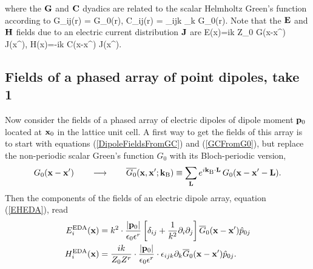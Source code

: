 \documentclass[letterpaper]{article}
\begin{document}
where the $\mathbf{G}$ and $\mathbf{C}$ dyadics are related to the
scalar Helmholtz Green's function according to
{
  G_{ij}(\vb r)
   =  G_0(\vb r),
\qquad
   C_{ij}(\vb r)
   = \varepsilon_{ijk} \partial_k G_0(\vb r).
}
Note that the $\mathbf{E}$ and $\mathbf{H}$ fields due to an electric 
current distribution $\mathbf{J}$ are
{ \vb E(\vb x)=ik Z_0 \int \vb G(\vb x-\vb x^\prime) \cdot \vb J(\vb x^\prime),
  \qquad
  \vb H(\vb x)=-ik \int \vb C(\vb x-\vb x^\prime) \cdot \vb J(\vb x^\prime).
}
   

\subsection*{Fields of a phased array of point dipoles, take 1}

Now consider the fields of a phased array of electric dipoles
of dipole moment $\mathbf{p}_0$ located at $\mathbf{x}_0$ in the lattice 
unit cell.
A first way to get the fields of this array is 
to start with equations (\ref{DipoleFieldsFromGC}) and
(\ref{GCFromG0}), but replace the non-periodic scalar
Green's function $G_0$ with its Bloch-periodic version,
$$ G_0(\mathbf{x}-\mathbf{x}^\prime) \qquad \longrightarrow \qquad 
   \overline{G_0}(\mathbf{x}, \mathbf{x}^\prime; \mathbf{k}_{\text{\scriptsize B}}) \equiv
   \sum_{\mathbf{L}} e^{i \mathbf{k}_{\text{\scriptsize B}} \cdot \mathbf{L}} \, G_0(\mathbf{x}- \mathbf{x}^\prime-\mathbf{L}).
$$
Then the components of the fields of an electric dipole array, 
equation (\ref{EHEDA}), read
\begin{align*}
 E_i^{\text{\scriptsize EDA}}(\mathbf{x})
 &=k^2 \cdot \frac{|\mathbf{p}_0|}{\epsilon_0 \epsilon^r } 
    \left[ \delta_{ij} + \frac{1}{k^2}\partial_i \partial_j
    \right] \overline{G}_{0}(\mathbf{x}-\mathbf{x}^\prime)\hat{p}_{0j}
\\
 H_i^{\text{\scriptsize EDA}}(\mathbf{x})
 &=\frac{ik}{Z_0 Z^r}
    \cdot \frac{|\mathbf{p}_0|}{\epsilon_0 \epsilon^r } \cdot
    \epsilon_{ijk} \partial_k \overline{G}_{0}(\mathbf{x}-\mathbf{x}^\prime)
    \hat{p}_{0j}.
\end{align*}
\end{document}
